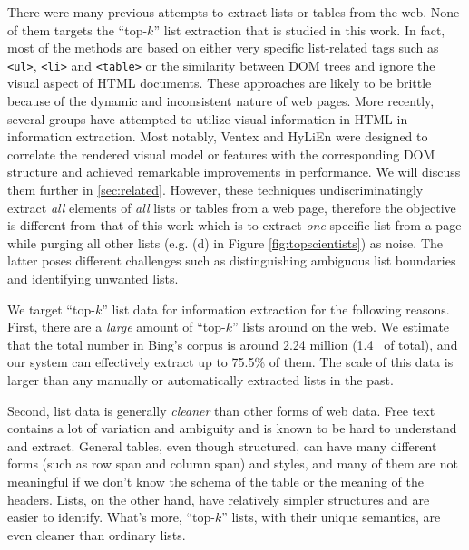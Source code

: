 There were many previous attempts to extract lists or tables from the web.
None of them targets the ``top-$k$'' list extraction that is studied in
this work. In fact, most of the methods are based on either very specific
list-related tags \cite{googlesets,webtables08}
such as {\tt <ul>}, {\tt <li>} and {\tt <table>}
or the similarity between DOM trees
\cite{LiuGZ03:MDR,MiaoTHSM09:TagPathClustering} and ignore
the visual aspect of HTML documents. These approaches are likely to be
brittle because of the dynamic and inconsistent nature of web
pages. More recently, several groups
have attempted to utilize visual information in HTML in
information extraction. Most notably, Ventex
\cite{GatterbauerBHKP2007:Towards} and HyLiEn \cite{FumarolaWBMH11:List}
were designed to correlate the rendered visual model or features
with the corresponding DOM structure and achieved remarkable improvements
in performance. We will discuss them further in \ref{sec:related}.
However, these techniques undiscriminatingly extract {\em all}
elements of {\em all} lists or tables from a web page, therefore the objective
is different from that of this work which is to extract {\em one} specific
list from a page while purging all other lists (e.g. (d) in
Figure \ref{fig:topscientists}) as noise. The latter poses
different challenges such as distinguishing ambiguous list boundaries
and identifying unwanted lists.

We target ``top-$k$'' list data for information extraction for the following reasons.
First, there are a {\em large} amount of ``top-$k$'' lists around on the web.
We estimate that the total number in Bing's corpus is around 2.24 million (1.4\textperthousand~
of total),
and our system can effectively extract up to 75.5\% of them. The scale of this
data is larger than any manually or automatically extracted lists in
the past.

Second, list data is generally {\em cleaner} than other forms of web data.
Free text contains a lot of variation and ambiguity and is known to be hard
to understand and extract. General tables, even though structured,
can have many different forms (such as row span and column span) and styles,
and many of them are not meaningful if we don't
know the schema of the table or the meaning of the headers.
Lists, on the other hand, have relatively simpler structures and are easier to
identify. What's more, ``top-$k$'' lists, with their unique semantics, are even
cleaner than ordinary lists.

